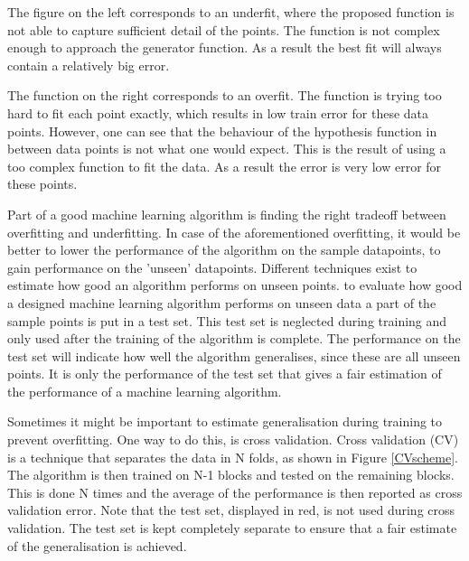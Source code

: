 
\npar

The figure on the left corresponds to an underfit, where the proposed function is not able to capture sufficient detail of the points. The function is not complex enough to approach the generator function. As a result the best fit will always contain a relatively big error.

\npar

The function on the right corresponds to an overfit. The function is trying too hard to fit each point exactly, which results in low train error for these data points. However, one can see that the behaviour of the hypothesis function in between data points is not what one would expect. This is the result of using a too complex function to fit the data. As a result the error is very low error for these points.

\npar 

Part of a good machine learning algorithm is finding the right tradeoff between overfitting and underfitting. In case of the aforementioned overfitting, it would be better to lower the performance of the algorithm on the sample datapoints, to gain performance on the 'unseen' datapoints. Different techniques exist to estimate how good an algorithm performs on unseen points. to evaluate how good a designed machine learning algorithm performs on unseen data a part of the sample points is put in a test set. This test set is neglected during training and only used after the training of the algorithm is complete. The performance on the test set will indicate how well the algorithm generalises, since these are all unseen points. It is only the performance of the test set that gives a fair estimation of the performance of a machine learning algorithm. 

\npar

Sometimes it might be important to estimate generalisation during training to prevent overfitting. One way to do this, is cross validation. Cross validation (CV) is a technique that separates the data in N folds, as shown in Figure \ref{CVscheme}. The algorithm is then trained on N-1 blocks and tested on the remaining blocks. This is done N times and the average of the performance is then reported as cross validation error. Note that the test set, displayed in red, is not used during cross validation. The test set is kept completely separate to ensure that a fair estimate of the generalisation is achieved.

